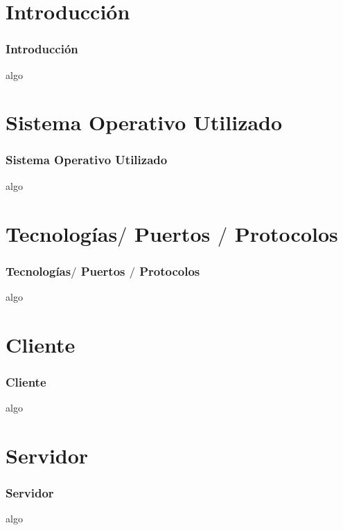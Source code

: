 \section{Introducci\'on}
  \begin{frame}
    \frametitle{Introducci\'on}
    algo
  \end{frame}
\section{Sistema Operativo Utilizado}
  \begin{frame}
    \frametitle{Sistema Operativo Utilizado}
    algo
  \end{frame}
\section{Tecnolog\'ias$/$ Puertos $/$ Protocolos}
  \begin{frame}
    \frametitle{Tecnolog\'ias$/$ Puertos $/$ Protocolos}
    algo
  \end{frame}
  
  
\section{Cliente}
  \begin{frame}
    \frametitle{Cliente}
    algo
  \end{frame}
\section{Servidor}
  \begin{frame}
    \frametitle{Servidor}
    algo
  \end{frame}
